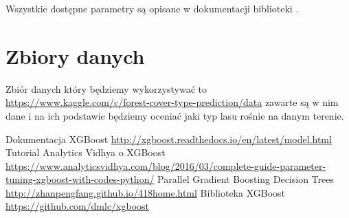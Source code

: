 \documentclass[a4paper,12p]{article}
\begin{document}
Wszystkie dostępne parametry są opisane w dokumentacji biblioteki \cite{github}.

\section{Zbiory danych}
Zbiór danych który będziemy wykorzystywać to \url{https://www.kaggle.com/c/forest-cover-type-prediction/data} zawarte są w nim dane i na ich podstawie będziemy oceniać jaki typ lasu rośnie na danym terenie.



\begin{thebibliography}{1}
 Dokumentacja XGBoost \url{http://xgboost.readthedocs.io/en/latest/model.html}
 Tutorial Analytics Vidhya o XGBoost \url{https://www.analyticsvidhya.com/blog/2016/03/complete-guide-parameter-tuning-xgboost-with-codes-python/}
 Parallel Gradient Boosting Decision Trees \url{http://zhanpengfang.github.io/418home.html}
 Biblioteka XGBoost \url{https://github.com/dmlc/xgboost}
\end{thebibliography}
\end{document}

